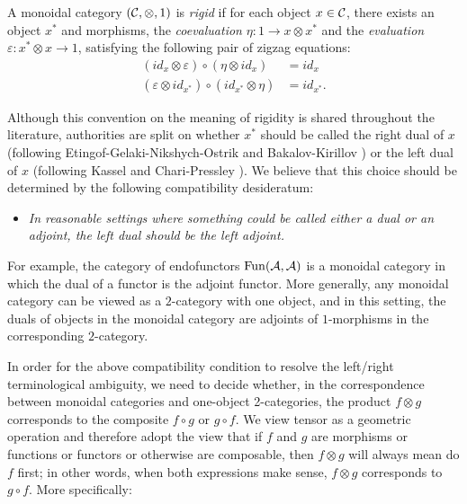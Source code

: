 \documentclass{amsart}
\begin{document}
\begin{definition} \label{def:rigid}
	A monoidal category $(\mathcal C, \otimes, 1)$ is {\em rigid} if for each object $x \in \mathcal C$, there exists an object $x^*$ and morphisms, the {\em coevaluation} $\eta: 1 \to x \otimes x^*$ and the {\em evaluation} $\varepsilon: x^* \otimes x \to 1$, satisfying the following pair of zigzag equations:
	\begin{align*}
		(id_{x} \otimes \varepsilon  ) \circ (  \eta \otimes id_{x}) &= id_{x} \\
		(\varepsilon \otimes id_{x^*}) \circ (id_{x^*} \otimes \eta) &= id_{x^*}.
	\end{align*}
\end{definition}

Although this convention on the meaning of rigidity is shared throughout the literature, authorities are split on whether $x^*$ should be called the right dual of $x$ (following Etingof-Gelaki-Nikshych-Ostrik \cite{EGNO} and Bakalov-Kirillov \cite{MR1797619})  or the left dual of $x$ (following Kassel \cite{MR1321145} and Chari-Pressley \cite{MR1358358}).  We believe that this choice should be determined by the following compatibility desideratum: 
\begin{itemize}
\item[]
	\emph{In reasonable settings where something could be called either a dual or an adjoint, the left dual should be the left adjoint.}
\end{itemize}

\nid For example, the category of endofunctors $\operatorname{Fun}(\mathcal A, \mathcal A)$ is a monoidal category in which the dual of a functor is the adjoint functor.  More generally, any monoidal category can be viewed as a $2$-category with one object, and in this setting, the duals of objects in the monoidal category are adjoints of $1$-morphisms in the corresponding $2$-category.  

In order for the above compatibility condition to resolve the left/right terminological ambiguity, we need to decide whether, in the correspondence between monoidal categories and one-object 2-categories, the product $f \otimes g$ corresponds to the composite $f \circ g$ or $g \circ f$.  We view tensor as a geometric operation and therefore adopt the view that if $f$ and $g$ are morphisms or functions or functors or otherwise are composable, then $f \otimes g$ will always mean do $f$ first; in other words, when both expressions make sense, $f \otimes g$ corresponds to $g \circ f$.  More specifically:
\end{document}

